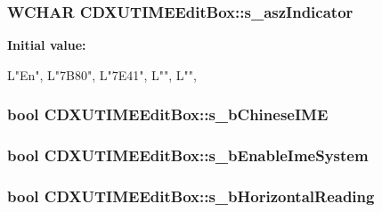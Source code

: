 \label{class_c_d_x_u_t_i_m_e_edit_box_ac2f3b1d2aedb78d1cf1e4aa1f816c58b}
\hypertarget{class_c_d_x_u_t_i_m_e_edit_box_a1f391bcb993b9f6c995f9a972efea9fc}{
\subsubsection[{s\_\-aszIndicator}]{\setlength{\rightskip}{0pt plus 5cm}WCHAR {\bf CDXUTIMEEditBox::s\_\-aszIndicator}}}
\label{class_c_d_x_u_t_i_m_e_edit_box_a1f391bcb993b9f6c995f9a972efea9fc}
{\bfseries Initial value:}
\begin{DoxyCode}
 
            {
                L"En",
                L"\x7B80",
                L"\x7E41",
                L"",
                L"",
            }
\end{DoxyCode}
\hypertarget{class_c_d_x_u_t_i_m_e_edit_box_afbfbbd0bfc8427fc6eb91f33a7338fcd}{
\subsubsection[{s\_\-bChineseIME}]{\setlength{\rightskip}{0pt plus 5cm}bool {\bf CDXUTIMEEditBox::s\_\-bChineseIME}}}
\label{class_c_d_x_u_t_i_m_e_edit_box_afbfbbd0bfc8427fc6eb91f33a7338fcd}
\hypertarget{class_c_d_x_u_t_i_m_e_edit_box_aaf0464cb8cb7d2bea823712c322f2b78}{
\subsubsection[{s\_\-bEnableImeSystem}]{\setlength{\rightskip}{0pt plus 5cm}bool {\bf CDXUTIMEEditBox::s\_\-bEnableImeSystem}}}
\label{class_c_d_x_u_t_i_m_e_edit_box_aaf0464cb8cb7d2bea823712c322f2b78}
\hypertarget{class_c_d_x_u_t_i_m_e_edit_box_aa097905fa88e08934010ce7ead10fb0b}{
\subsubsection[{s\_\-bHorizontalReading}]{\setlength{\rightskip}{0pt plus 5cm}bool {\bf CDXUTIMEEditBox::s\_\-bHorizontalReading}}}
